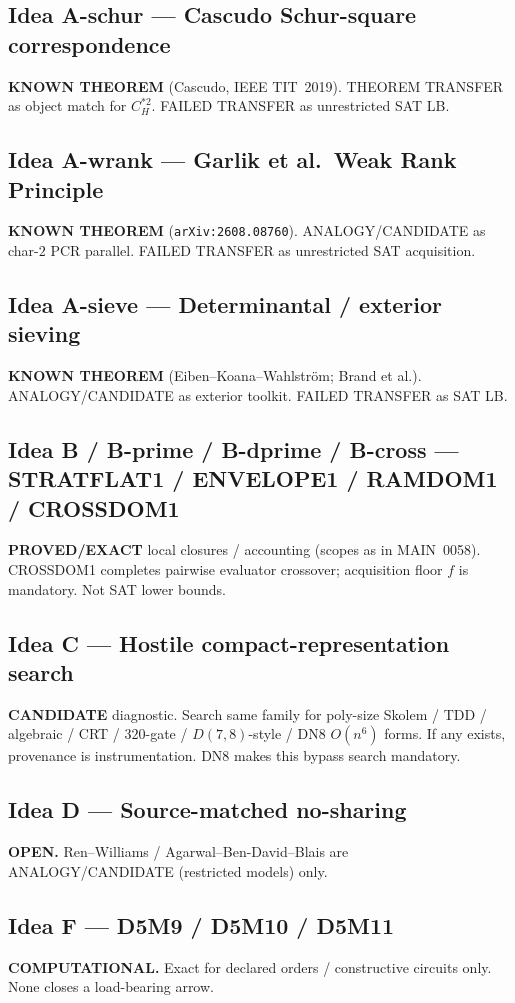 \documentclass[11pt]{article}
\begin{document}
\subsection*{Idea A-schur --- Cascudo Schur-square correspondence}
\textbf{KNOWN THEOREM} (Cascudo, IEEE TIT~2019). THEOREM TRANSFER as object match
for $C_H^{*2}$. FAILED TRANSFER as unrestricted SAT LB.

\subsection*{Idea A-wrank --- Garlik et al.\ Weak Rank Principle}
\textbf{KNOWN THEOREM} (\texttt{arXiv:2608.08760}). ANALOGY/CANDIDATE as char-$2$
PCR parallel. FAILED TRANSFER as unrestricted SAT acquisition.

\subsection*{Idea A-sieve --- Determinantal / exterior sieving}
\textbf{KNOWN THEOREM} (Eiben--Koana--Wahlstr\"om; Brand et al.). ANALOGY/CANDIDATE
as exterior toolkit. FAILED TRANSFER as SAT LB.

\subsection*{Idea B / B-prime / B-dprime / B-cross --- STRATFLAT1 / ENVELOPE1 / RAMDOM1 / CROSSDOM1}
\textbf{PROVED/EXACT} local closures / accounting (scopes as in MAIN~0058).
CROSSDOM1 completes pairwise evaluator crossover; acquisition floor $f$ is
mandatory. Not SAT lower bounds.

\subsection*{Idea C --- Hostile compact-representation search}
\textbf{CANDIDATE} diagnostic. Search same family for poly-size Skolem / TDD /
algebraic / CRT / $320$-gate / $D(7,8)$-style / DN8 $O(n^6)$ forms. If any exists,
provenance is instrumentation. DN8 makes this bypass search mandatory.

\subsection*{Idea D --- Source-matched no-sharing}
\textbf{OPEN.} Ren--Williams / Agarwal--Ben-David--Blais are ANALOGY/CANDIDATE
(restricted models) only.

\subsection*{Idea F --- D5M9 / D5M10 / D5M11}
\textbf{COMPUTATIONAL.} Exact for declared orders / constructive circuits only.
None closes a load-bearing arrow.
\end{document}
